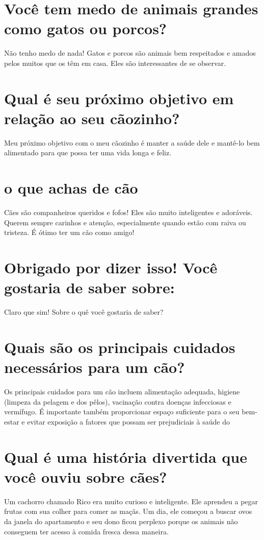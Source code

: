 \documentclass[11pt,a4paper]{article}
\begin{document}
\section{Você tem medo de animais grandes como gatos ou porcos?}
Não tenho medo de nada! Gatos e porcos são animais bem respeitados e amados pelos muitos que os têm em casa. Eles são interessantes de se observar.

\section{Qual é seu próximo objetivo em relação ao seu cãozinho?}
Meu próximo objetivo com o meu cãozinho é manter a saúde dele e mantê-lo bem alimentado para que possa ter uma vida longa e feliz.

\section{o que achas de cão}
Cães são companheiros queridos e fofos! Eles são muito inteligentes e adoráveis. Querem sempre carinhos e atenção, especialmente quando estão com raiva ou tristeza. É ótimo ter um cão como amigo!

\section{Obrigado por dizer isso! Você gostaria de saber sobre:}
Claro que sim! Sobre o quê você gostaria de saber?

\section{Quais são os principais cuidados necessários para um cão?}
Os principais cuidados para um cão incluem alimentação adequada, higiene (limpeza da pelagem e dos pêlos), vacinação contra doenças infecciosas e vermífugo. É importante também proporcionar espaço suficiente para o seu bem-estar e evitar exposição a fatores que possam ser prejudiciais à saúde do

\section{Qual é uma história divertida que você ouviu sobre cães?}
Um cachorro chamado Rico era muito curioso e inteligente. Ele aprendeu a pegar frutas com sua colher para comer as maçãs. Um dia, ele começou a buscar ovos da janela do apartamento e seu dono ficou perplexo porque os animais não conseguem ter acesso à comida fresca dessa maneira.
\end{document}
